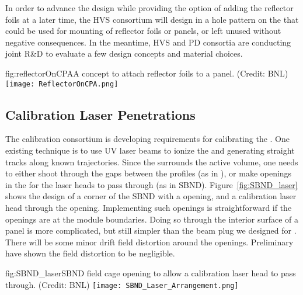 In order to advance the  design while providing the option of adding the reflector foils at a later time, the HVS consortium will design in a hole pattern 
on the %
 that could be used for mounting of reflector foils or panels, or left unused without negative consequences. In the meantime, HVS and PD consortia are conducting joint R\&D to evaluate a few design concepts and material choices. 


\begin{dunefigure}{fig:reflectorOnCPA}{A concept to attach reflector foils to a  panel. (Credit: BNL)}
\texttt{[image: ReflectorOnCPA.png]}
\end{dunefigure}

\subsection{Calibration Laser Penetrations}

The calibration consortium is developing requirements for calibrating the  \efield.  One existing technique is to use UV laser beams to ionize the  and generating straight tracks along known trajectories.  Since the  surrounds the  active volume, one needs to either shoot through the gaps between the  profiles (as in \microboone), or make openings in the   for the laser heads to pass through (as in SBND).    Figure~\ref{fig:SBND_laser}  shows the design of a corner of the SBND  with a   opening, and a calibration laser head through the opening.  Implementing such openings is straightforward if the openings are at the   module boundaries.  Doing so through the interior surface of a  panel is more complicated, but still simpler than the beam plug we designed for .  There will be some minor drift field distortion around the openings.  Preliminary  have shown the field distortion to be negligible. 

\begin{dunefigure}{fig:SBND_laser}{SBND field cage opening to allow a calibration laser head to pass through. (Credit: BNL)}
\texttt{[image: SBND\_Laser\_Arrangement.png]}
\end{dunefigure}


